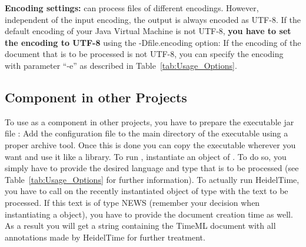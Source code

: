 \textbf{Encoding settings:}
\product{} can process files of different encodings. However, independent of the input encoding, the output is always encoded as UTF-8. If the default encoding of your Java Virtual Machine is not UTF-8, \textbf{you have to set the encoding to UTF-8} using the -Dfile.encoding option:
\newline {}\newline
If the encoding of the document that is to be processed is not UTF-8, you can specify the encoding with parameter ``-e'' as described in Table~\ref{tab:Usage_Options}.

\subsection{Component in other Projects}\label{sec:Usage_Component}
To use \product{} as a component in other projects, you have to prepare the executable jar file \executableFile{}: Add the configuration file \configFile{} to the main directory of the executable using a proper archive tool. Once this is done you can copy the executable wherever you want and use it like a library. To run \product{}, instantiate an object of . To do so, you simply have to provide the desired language and type that is to be processed (see Table~\ref{tab:Usage_Options} for further information). To actually run HeidelTime, you have to call  on the recently instantiated object of type  with the text to be processed. If this text is of type NEWS (remember your decision when instantiating a  object), you have to provide the document creation time as well. As a result you will get a string containing the TimeML document with all annotations made by HeidelTime for further treatment.
